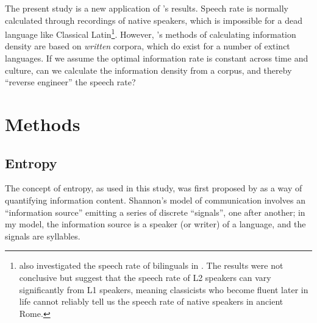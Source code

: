 \documentclass[12pt,twoside]{article}
\begin{document}
The present study is a new application of \citeauthor{coupé}'s results. Speech rate is normally calculated through recordings of native speakers, which is impossible for a dead language like Classical Latin\footnote{\citeauthor{oh} also investigated the speech rate of bilinguals in \cite{ohbilingual}. The results were not conclusive but suggest that the speech rate of L2 speakers can vary significantly from L1 speakers, meaning classicists who become fluent later in life cannot reliably tell us the speech rate of native speakers in ancient Rome.}. However, \citeauthor{oh}'s methods of calculating information density are based on \emph{written} corpora, which do exist for a number of extinct languages. If we assume the optimal information rate is constant across time and culture, can we calculate the information density from a corpus, and thereby ``reverse engineer'' the speech rate? %




\section{Methods}
\label{sec:meth}

\subsection{Entropy}
\label{subsec:entropy}

The concept of entropy, as used in this study, was first proposed by \citet{shannon} as a way of quantifying information content. Shannon's model of communication involves an ``information source'' emitting a series of discrete ``signals'', one after another; in my model, the information source is a speaker (or writer) of a language, and the signals are syllables.
\end{document}
